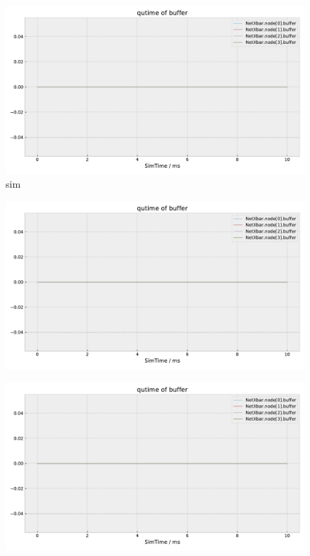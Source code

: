 \documentclass[]{scrartcl}
\begin{document}
\begin{figure}[ht]
    \centering
    \includegraphics[width=\columnwidth, page=2]{../../python/results/postopt-General-0}
    \caption{sim}%
    \label{fig:postopt-inport-qlen}
\end{figure}
\begin{figure}[ht]
    \centering
    \includegraphics[width=\columnwidth, page=8]{../../python/results/postopt-General-0}
    \caption{}%
    \label{fig:postopt-app-e2e}
\end{figure}
\begin{figure}[ht]
    \centering
    \includegraphics[width=\columnwidth, page=4]{../../python/results/postopt-General-0}
    \caption{}%
    \label{fig:postopt-arbiter-qlen}
\end{figure}
\end{document}
